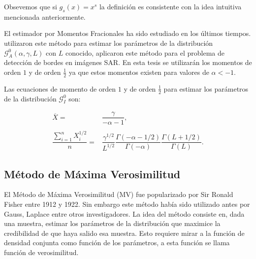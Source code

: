 Obsevemos que si $g_s(x)=x^s$ la definición es consistente con la idea intuitiva mencionada anteriormente.
%

El estimador por Momentos Fracionales ha sido estudiado en los últimos tiempos. \citet{Frery97} utilizaron este método para estimar los parámetros de la distribución $\mathcal{G}_A^0(\alpha,\gamma,L)$ con $L$ conocido,  \citet{GambiniSC08} aplicaron este método para el problema de detección de bordes en imágenes SAR. En esta tesis se utilizarán los momentos de orden $1$ y de orden $\frac{1}{2}$ ya que estos momentos existen para valores de $\alpha<-1$.

Las ecuaciones de momento de orden $1$ y de orden $\frac{1}{2}$ para estimar los parámetros de la distribución $\mathcal G_I^0$ son:

\begin{align}
\label{momento1medio}
\nonumber \overline{X}=&\dfrac{\gamma}{-\alpha - 1}, \\
\nonumber \\ 
\dfrac{\sum_{i=1}^n X_i^{1/2}}{n}=&\dfrac{\gamma^{1/2}}{L^{1/2}}\dfrac{\Gamma(-\alpha - 1/2)}{\Gamma(-\alpha)}\dfrac{\Gamma(L+ 1/2)}{\Gamma(L)}.
\end{align}


\subsection{Método de Máxima Verosimilitud}
\label{MetodoMV}


El Método de Máxima Verosimilitud (MV) fue popularizado por Sir Ronald Fisher entre 1912 y 1922. Sin embargo este método había sido utilizado antes por Gauss, Laplace entre otros investigadores. 
La idea del método consiste en, dada una muestra, estimar los parámetros de la distribución que maximice la credibilidad de que haya salido esa muestra. 
Esto requiere mirar a la función de densidad conjunta como función de los parámetros, a esta función se llama función de verosimilitud.

